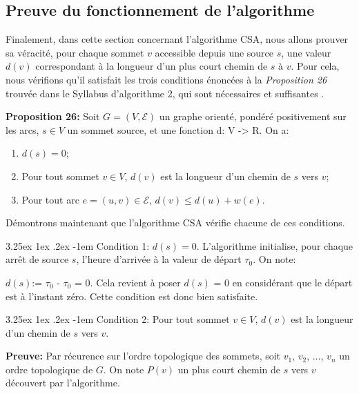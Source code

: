 \documentclass[12pt]{article}
\makeatletter
\renewcommand\paragraph{\@startsection{paragraph}{5}{\z@}%
  {3.25ex \@plus1ex \@minus.2ex}%
  {-1em}%
  {\normalfont\normalsize\bfseries}}
\makeatother
\begin{document}
\subsection{Preuve du fonctionnement de l'algorithme}

Finalement, dans cette section concernant l'algorithme CSA, nous allons prouver sa véracité, pour chaque sommet $v$ accessible depuis une source $s$, une 
valeur $d(v)$ correspondant à la longueur d'un plus court chemin de $s$ à $v$. Pour cela, nous vérifions qu'il satisfait les trois conditions énoncées 
à la \emph{Proposition 26} trouvée dans le Syllabus d'algorithme 2, qui sont nécessaires et suffisantes \cite{syllabusAlgo2}.

\textbf{Proposition 26:} Soit $G = (V, \mathcal{E})$ un graphe orienté, pondéré positivement sur les arcs, $s \in V$ un sommet source, et une fonction 
d: V -> R.
On a:
\begin{enumerate}
    \item $d(s) = 0$;
    \item Pour tout sommet $v \in V$, $d(v)$ est la longueur d'un chemin de $s$ vers $v$;
    \item Pour tout arc $e = (u, v) \in \mathcal{E}$, $d(v) \leq d(u) + w(e)$.
\end{enumerate}

\noindent Démontrons maintenant que l'algorithme CSA vérifie chacune de ces conditions.

\paragraph{Condition 1:}
 $d(s) = 0$.
L'algorithme initialise, pour chaque arrêt de source $s$, l'heure d'arrivée à la valeur de départ $\tau_0$. On note:

$d(s)$:= $\tau_0$ - $\tau_0$ = 0.
Cela revient à poser $d(s)$ = 0 en considérant que le départ est à l'instant zéro. Cette condition est donc bien satisfaite.

\paragraph{Condition 2:} 
Pour tout sommet $v \in V$, $d(v)$ est la longueur d'un chemin de $s$ vers $v$.

\medskip

\textbf{Preuve:}
Par récurence sur l'ordre topologique des sommets,
soit $v_1$, $v_2$, $\dots$, $v_n$ un ordre topologique de $G$. On note $P(v)$ un plus court chemin de $s$ vers $v$ découvert par l'algorithme.
\end{document}
